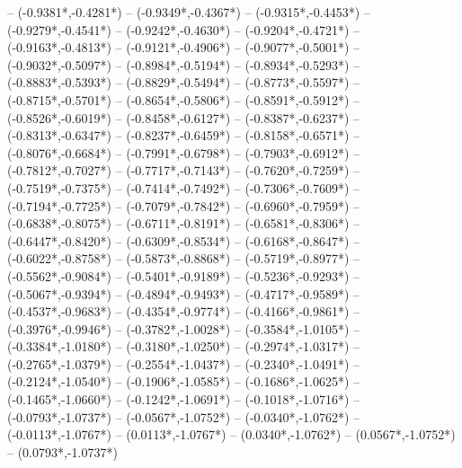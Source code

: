 {	-- ({-0.9381*\dx},{-0.4281*\dy})
	-- ({-0.9349*\dx},{-0.4367*\dy})
	-- ({-0.9315*\dx},{-0.4453*\dy})
	-- ({-0.9279*\dx},{-0.4541*\dy})
	-- ({-0.9242*\dx},{-0.4630*\dy})
	-- ({-0.9204*\dx},{-0.4721*\dy})
	-- ({-0.9163*\dx},{-0.4813*\dy})
	-- ({-0.9121*\dx},{-0.4906*\dy})
	-- ({-0.9077*\dx},{-0.5001*\dy})
	-- ({-0.9032*\dx},{-0.5097*\dy})
	-- ({-0.8984*\dx},{-0.5194*\dy})
	-- ({-0.8934*\dx},{-0.5293*\dy})
	-- ({-0.8883*\dx},{-0.5393*\dy})
	-- ({-0.8829*\dx},{-0.5494*\dy})
	-- ({-0.8773*\dx},{-0.5597*\dy})
	-- ({-0.8715*\dx},{-0.5701*\dy})
	-- ({-0.8654*\dx},{-0.5806*\dy})
	-- ({-0.8591*\dx},{-0.5912*\dy})
	-- ({-0.8526*\dx},{-0.6019*\dy})
	-- ({-0.8458*\dx},{-0.6127*\dy})
	-- ({-0.8387*\dx},{-0.6237*\dy})
	-- ({-0.8313*\dx},{-0.6347*\dy})
	-- ({-0.8237*\dx},{-0.6459*\dy})
	-- ({-0.8158*\dx},{-0.6571*\dy})
	-- ({-0.8076*\dx},{-0.6684*\dy})
	-- ({-0.7991*\dx},{-0.6798*\dy})
	-- ({-0.7903*\dx},{-0.6912*\dy})
	-- ({-0.7812*\dx},{-0.7027*\dy})
	-- ({-0.7717*\dx},{-0.7143*\dy})
	-- ({-0.7620*\dx},{-0.7259*\dy})
	-- ({-0.7519*\dx},{-0.7375*\dy})
	-- ({-0.7414*\dx},{-0.7492*\dy})
	-- ({-0.7306*\dx},{-0.7609*\dy})
	-- ({-0.7194*\dx},{-0.7725*\dy})
	-- ({-0.7079*\dx},{-0.7842*\dy})
	-- ({-0.6960*\dx},{-0.7959*\dy})
	-- ({-0.6838*\dx},{-0.8075*\dy})
	-- ({-0.6711*\dx},{-0.8191*\dy})
	-- ({-0.6581*\dx},{-0.8306*\dy})
	-- ({-0.6447*\dx},{-0.8420*\dy})
	-- ({-0.6309*\dx},{-0.8534*\dy})
	-- ({-0.6168*\dx},{-0.8647*\dy})
	-- ({-0.6022*\dx},{-0.8758*\dy})
	-- ({-0.5873*\dx},{-0.8868*\dy})
	-- ({-0.5719*\dx},{-0.8977*\dy})
	-- ({-0.5562*\dx},{-0.9084*\dy})
	-- ({-0.5401*\dx},{-0.9189*\dy})
	-- ({-0.5236*\dx},{-0.9293*\dy})
	-- ({-0.5067*\dx},{-0.9394*\dy})
	-- ({-0.4894*\dx},{-0.9493*\dy})
	-- ({-0.4717*\dx},{-0.9589*\dy})
	-- ({-0.4537*\dx},{-0.9683*\dy})
	-- ({-0.4354*\dx},{-0.9774*\dy})
	-- ({-0.4166*\dx},{-0.9861*\dy})
	-- ({-0.3976*\dx},{-0.9946*\dy})
	-- ({-0.3782*\dx},{-1.0028*\dy})
	-- ({-0.3584*\dx},{-1.0105*\dy})
	-- ({-0.3384*\dx},{-1.0180*\dy})
	-- ({-0.3180*\dx},{-1.0250*\dy})
	-- ({-0.2974*\dx},{-1.0317*\dy})
	-- ({-0.2765*\dx},{-1.0379*\dy})
	-- ({-0.2554*\dx},{-1.0437*\dy})
	-- ({-0.2340*\dx},{-1.0491*\dy})
	-- ({-0.2124*\dx},{-1.0540*\dy})
	-- ({-0.1906*\dx},{-1.0585*\dy})
	-- ({-0.1686*\dx},{-1.0625*\dy})
	-- ({-0.1465*\dx},{-1.0660*\dy})
	-- ({-0.1242*\dx},{-1.0691*\dy})
	-- ({-0.1018*\dx},{-1.0716*\dy})
	-- ({-0.0793*\dx},{-1.0737*\dy})
	-- ({-0.0567*\dx},{-1.0752*\dy})
	-- ({-0.0340*\dx},{-1.0762*\dy})
	-- ({-0.0113*\dx},{-1.0767*\dy})
	-- ({0.0113*\dx},{-1.0767*\dy})
	-- ({0.0340*\dx},{-1.0762*\dy})
	-- ({0.0567*\dx},{-1.0752*\dy})
	-- ({0.0793*\dx},{-1.0737*\dy})
}
